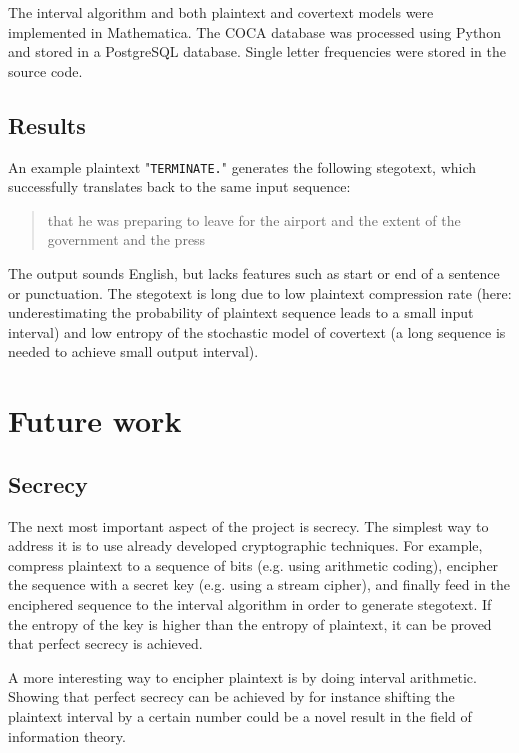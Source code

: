 \documentclass[12pt,twoside,a4paper]{article}
\makeatletter
\newcommand*{\eg}{e.g.\@\xspace}
\makeatother
\begin{document}
The interval algorithm and both plaintext and covertext models were implemented in Mathematica. The COCA database was processed using Python and stored in a PostgreSQL database. Single letter frequencies were stored in the source code.

\subsection{Results}

An example plaintext "\texttt{TERMINATE.}" generates the following stegotext, which successfully translates back to the same input sequence:

\begin{quote}
that he was preparing to leave for the airport and the extent of the government and the press
\end{quote}

The output sounds English, but lacks features such as start or end of a sentence or punctuation. The stegotext is long due to low plaintext compression rate (here: underestimating the probability of plaintext sequence leads to a small input interval) and low entropy of the stochastic model of covertext (a long sequence is needed to achieve small output interval).

\section{Future work}

\subsection{Secrecy}

The next most important aspect of the project is secrecy. The simplest way to address it is to use already developed cryptographic techniques. For example, compress plaintext to a sequence of bits (\eg using arithmetic coding), encipher the sequence with a secret key (\eg using a stream cipher), and finally feed in the enciphered sequence to the interval algorithm in order to generate stegotext. If the entropy of the key is higher than the entropy of plaintext, it can be proved that perfect secrecy is achieved.

A more interesting way to encipher plaintext is by doing interval arithmetic. Showing that perfect secrecy can be achieved by for instance shifting the plaintext interval by a certain number could be a novel result in the field of information theory.
\end{document}

